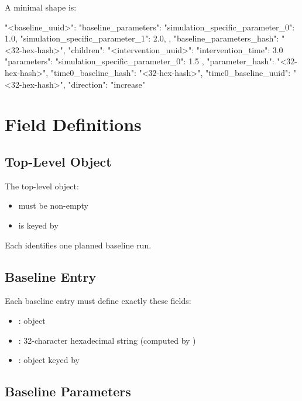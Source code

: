 \documentclass[11pt]{article}
\begin{document}
A minimal shape is:

\begin{DocCode}
{
  "<baseline_uuid>": {
    "baseline_parameters": {
      "simulation_specific_parameter_0": 1.0,
      "simulation_specific_parameter_1": 2.0,
    },
    "baseline_parameters_hash": "<32-hex-hash>",
    "children": {
      "<intervention_uuid>": {
        "intervention_time": 3.0
        "parameters": {
          "simulation_specific_parameter_0": 1.5
        },
        "parameter_hash": "<32-hex-hash>",
        "time0_baseline_hash": "<32-hex-hash>",
        "time0_baseline_uuid": "<32-hex-hash>",
        "direction": "increase"
      }
    }
  }
}
\end{DocCode}

\section*{Field Definitions}

\subsection*{Top-Level Object}

The top-level object:
\begin{itemize}
\item must be non-empty
\item is keyed by 
\end{itemize}

Each  identifies one planned baseline run.

\subsection*{Baseline Entry}

Each baseline entry must define exactly these fields:
\begin{itemize}
\item {}: object
\item {}: 32-character hexadecimal string (computed by )
\item {}: object keyed by 
\end{itemize}

\subsection*{Baseline Parameters}
\end{document}
